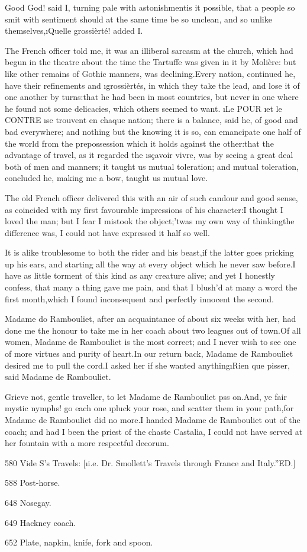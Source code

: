 \documentclass[twoside]{article}
\begin{document}
Good God! said I, turning pale with astonishment\tsk is it possible, that a
people so smit with sentiment should at the same time be so unclean, and
so unlike themselves,\tsk \i{Quelle grossièrté}! added I.

The French officer told me, it was an illiberal sarcasm at the church,
which had begun in the theatre about the time the Tartuffe was given in
it by Molière: but like other remains of Gothic manners, was
declining.\tsk Every nation, continued he, have their refinements and
\i{grossièrtés}, in which they take the lead, and lose it of one another by
turns:\tsk that he had been in most countries, but never in one where he
found not some delicacies, which others seemed to want.  \i{Le} POUR \i{et
le} CONTRE \i{se trouvent en chaque nation}; there is a balance, said he,
of good and bad everywhere; and nothing but the knowing it is so, can
emancipate one half of the world from the prepossession which it holds
against the other:\tsk that the advantage of travel, as it regarded the
\i{sçavoir vivre}, was by seeing a great deal both of men and manners; it
taught us mutual toleration; and mutual toleration, concluded he, making
me a bow, taught us mutual love.

The old French officer delivered this with an air of such candour and
good sense, as coincided with my first favourable impressions of his
character:\tsk I thought I loved the man; but I fear I mistook the
object;\tsk ’twas my own way of thinking\tsk the difference was, I could not have
expressed it half so well.

It is alike troublesome to both the rider and his beast,\tsk if the latter
goes pricking up his ears, and starting all the way at every object which
he never saw before.\tsk I have as little torment of this kind as any
creature alive; and yet I honestly confess, that many a thing gave me
pain, and that I blush’d at many a word the first month,\tsk which I found
inconsequent and perfectly innocent the second.

Madame do Rambouliet, after an acquaintance of about six weeks with her,
had done me the honour to take me in her coach about two leagues out of
town.\tsk Of all women, Madame de Rambouliet is the most correct; and I never
wish to see one of more virtues and purity of heart.\tsk In our return back,
Madame de Rambouliet desired me to pull the cord.\tsk I asked her if she
wanted anything\tsk \i{Rien que pisser}, said Madame de Rambouliet.

Grieve not, gentle traveller, to let Madame de Rambouliet p\tsk ss on.\tsk And,
ye fair mystic nymphs! go each one \i{pluck your rose}, and scatter them in
your path,\tsk for Madame de Rambouliet did no more.\tsk I handed Madame de
Rambouliet out of the coach; and had I been the priest of the chaste
Castalia, I could not have served at her fountain with a more respectful
decorum.









{580}  Vide S\tsk ’s Travels: [\i{i.e.} Dr. Smollett’s \lqq Travels through France
and Italy.”\tsk ED.]

{588}  Post-horse.

{648}  Nosegay.

{649}  Hackney coach.

{652}  Plate, napkin, knife, fork and spoon.
\end{document}
